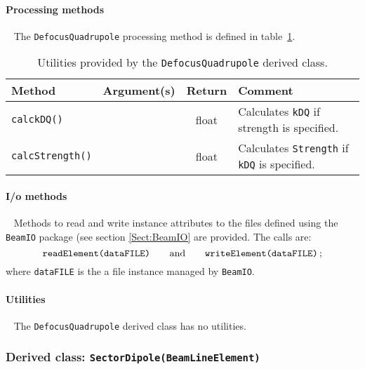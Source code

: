 \paragraph{Processing methods} ~\newline
\noindent
The \texttt{DefocusQuadrupole} processing method is defined in
table~\ref{Tab:DQuad:Methods}.
\begin{table}[h]
  \caption{
    Utilities provided by the \texttt{DefocusQuadrupole} derived
    class. 
  }
  \label{Tab:DQuad:Methods}
  \begin{center}
    \begin{tabular}{|l|c|c|p{7cm}|}
      \hline
      \textbf{Method} & \textbf{Argument(s)} & \textbf{Return} & \textbf{Comment}                     \\
      \hline
      \texttt{calckDQ()} &  & float & Calculates \texttt{kDQ} if strength is specified.               \\
      \texttt{calcStrength()} &  & float & Calculates \texttt{Strength} if \texttt{kDQ} is specified. \\
      \hline
    \end{tabular}
  \end{center}
\end{table}

\paragraph{I/o methods} ~\newline
\noindent
Methods to read and write instance attributes to the files defined
using the \texttt{BeamIO} package (see section \ref{Sect:BeamIO} are
provided.
The calls are:
\begin{equation}
  \texttt{readElement(dataFILE)} \quad \quad {\rm and }
      \quad \quad \texttt{writeElement(dataFILE)} \,; \nonumber
\end{equation}
where \texttt{dataFILE} is the a file instance managed by \texttt{BeamIO}.

\paragraph{Utilities} ~\newline
\noindent
The \texttt{DefocusQuadrupole} derived class has no utilities.

\FloatBarrier

\subsubsection{Derived class: \texttt{SectorDipole(BeamLineElement)}}

